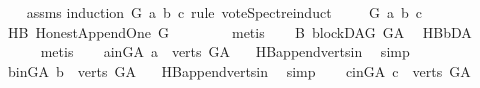 \begin{isabellebody}
%
\isadelimproof
\ \ %
\endisadelimproof
%
\isatagproof
{}\isamarkupfalse%
\ assms\isanewline
{}\isamarkupfalse%
{\isacharparenleft}{\kern0pt}induction\ G\ a\ b\ c\ rule{\isacharcolon}{\kern0pt}\ vote{\isacharunderscore}{\kern0pt}Spectre{\isachardot}{\kern0pt}induct{\isacharparenright}{\kern0pt}\isanewline
\ \ \isamarkupfalse%
\ {\isacharparenleft}{\kern0pt}{}\ G\ a\ b\ c{\isacharparenright}{\kern0pt}\isanewline
\ \ \isamarkupfalse%
\ HB{}{\isacharcolon}{\kern0pt}\ Honest{\isacharunderscore}{\kern0pt}Append{\isacharunderscore}{\kern0pt}One\ {\isachardoublequoteopen}G{\isachardoublequoteclose}\ \isamarkupfalse%
\ {}{\isacharparenleft}{\kern0pt}{}{\isacharparenright}{\kern0pt}\isanewline
\ \ \ \ \isamarkupfalse%
\ metis\isanewline
\ \ \isamarkupfalse%
\ B{}{\isacharcolon}{\kern0pt}\ blockDAG\ {\isachardoublequoteopen}G{\isacharunderscore}{\kern0pt}A{\isachardoublequoteclose}\ \isamarkupfalse%
\ HB{}{\isachardot}{\kern0pt}bD{\isacharunderscore}{\kern0pt}A\ \isanewline
\ \ \ \ \isamarkupfalse%
\ metis\isanewline
\ \ \isamarkupfalse%
\ a{\isacharunderscore}{\kern0pt}in{\isacharunderscore}{\kern0pt}G{\isacharunderscore}{\kern0pt}A{\isacharcolon}{\kern0pt}\ {\isachardoublequoteopen}a\ {\isasymin}\ verts\ G{\isacharunderscore}{\kern0pt}A{\isachardoublequoteclose}\ \isamarkupfalse%
\ {}{\isacharparenleft}{\kern0pt}{}{\isacharparenright}{\kern0pt}\ HB{}{\isachardot}{\kern0pt}append{\isacharunderscore}{\kern0pt}verts{\isacharunderscore}{\kern0pt}in\ \isamarkupfalse%
\ simp\isanewline
\ \ \isamarkupfalse%
\ b{\isacharunderscore}{\kern0pt}in{\isacharunderscore}{\kern0pt}G{\isacharunderscore}{\kern0pt}A{\isacharcolon}{\kern0pt}\ {\isachardoublequoteopen}b\ {\isasymin}\ verts\ G{\isacharunderscore}{\kern0pt}A{\isachardoublequoteclose}\ \isamarkupfalse%
\ {}{\isacharparenleft}{\kern0pt}{}{\isacharparenright}{\kern0pt}\ HB{}{\isachardot}{\kern0pt}append{\isacharunderscore}{\kern0pt}verts{\isacharunderscore}{\kern0pt}in\ \isamarkupfalse%
\ simp\isanewline
\ \ \isamarkupfalse%
\ c{\isacharunderscore}{\kern0pt}in{\isacharunderscore}{\kern0pt}G{\isacharunderscore}{\kern0pt}A{\isacharcolon}{\kern0pt}\ {\isachardoublequoteopen}c\ {\isasymin}\ verts\ G{\isacharunderscore}{\kern0pt}A{\isachardoublequoteclose}\ \isamarkupfalse%

\end{isabellebody}

